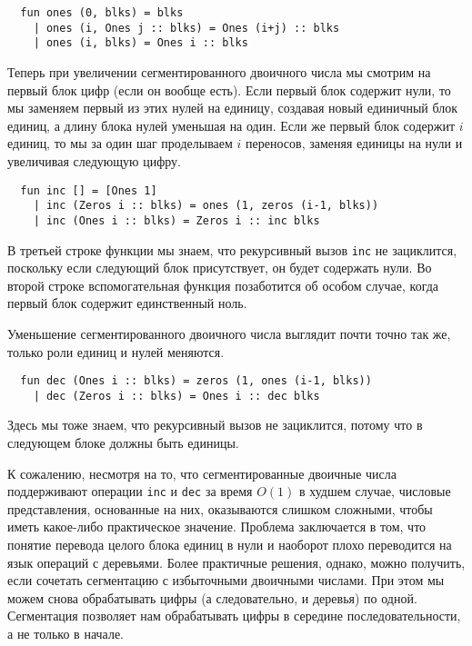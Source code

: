 \begin{frame}[fragile]{}
\begin{lstlisting}
  fun ones (0, blks) = blks
    | ones (i, Ones j :: blks) = Ones (i+j) :: blks
    | ones (i, blks) = Ones i :: blks
\end{lstlisting}
Теперь при увеличении сегментированного двоичного числа мы смотрим на
первый блок цифр (если он вообще есть). Если первый блок содержит
нули, то мы заменяем первый из этих нулей на единицу, создавая новый
единичный блок единиц, а длину блока нулей уменьшая на один. Если же
первый блок содержит $i$ единиц, то мы за один шаг проделываем $i$
переносов, заменяя единицы на нули и увеличивая следующую цифру.
\begin{lstlisting}
  fun inc [] = [Ones 1]
    | inc (Zeros i :: blks) = ones (1, zeros (i-1, blks))
    | inc (Ones i :: blks) = Zeros i :: inc blks
\end{lstlisting}
В третьей строке функции мы знаем, что рекурсивный вызов
\lstinline!inc! не зациклится, поскольку если следующий блок
присутствует, он будет содержать нули. Во второй строке
вспомогательная функция позаботится об особом случае, когда первый
блок содержит единственный ноль.

Уменьшение сегментированного двоичного числа выглядит почти точно так
же, только роли единиц и нулей меняются.
\begin{lstlisting}
  fun dec (Ones i :: blks) = zeros (1, ones (i-1, blks))
    | dec (Zeros i :: blks) = Ones i :: dec blks
\end{lstlisting}
Здесь мы тоже знаем, что рекурсивный вызов не зациклится, потому что в
следующем блоке должны быть единицы.

К сожалению, несмотря на то, что сегментированные двоичные числа
поддерживают операции \lstinline!inc! и \lstinline!dec! за время
$O(1)$ в худшем случае, числовые представления, основанные на них,
оказываются слишком сложными, чтобы иметь какое-либо практическое
значение. Проблема заключается в том, что понятие перевода целого
блока единиц в нули и наоборот плохо переводится на язык операций с
деревьями. Более практичные решения, однако, можно получить, если
сочетать сегментацию с избыточными двоичными числами. При этом мы
можем снова обрабатывать цифры (а следовательно, и деревья) по
одной. Сегментация позволяет нам обрабатывать цифры в середине
последовательности, а не только в начале.


\end{frame}
